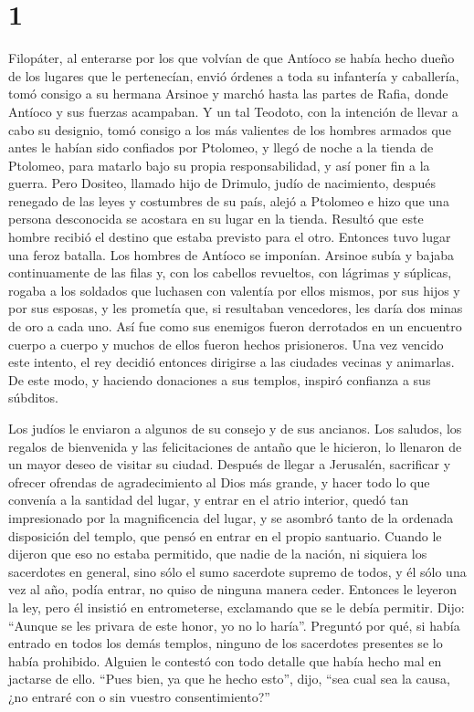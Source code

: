 \hypertarget{section}{%
\section{1}\label{section}}

 Filopáter, al enterarse por los que volvían de que
Antíoco se había hecho dueño de los lugares que le pertenecían, envió
órdenes a toda su infantería y caballería, tomó consigo a su hermana
Arsinoe y marchó hasta las partes de Rafia, donde Antíoco y sus fuerzas
acampaban.  Y un tal Teodoto, con la intención de llevar a
cabo su designio, tomó consigo a los más valientes de los hombres
armados que antes le habían sido confiados por Ptolomeo, y llegó de
noche a la tienda de Ptolomeo, para matarlo bajo su propia
responsabilidad, y así poner fin a la guerra.  Pero
Dositeo, llamado hijo de Drimulo, judío de nacimiento, después renegado
de las leyes y costumbres de su país, alejó a Ptolomeo e hizo que una
persona desconocida se acostara en su lugar en la tienda. Resultó que
este hombre recibió el destino que estaba previsto para el otro.
 Entonces tuvo lugar una feroz batalla. Los hombres de
Antíoco se imponían. Arsinoe subía y bajaba continuamente de las filas
y, con los cabellos revueltos, con lágrimas y súplicas, rogaba a los
soldados que luchasen con valentía por ellos mismos, por sus hijos y por
sus esposas, y les prometía que, si resultaban vencedores, les daría dos
minas de oro a cada uno.  Así fue como sus enemigos fueron
derrotados en un encuentro cuerpo a cuerpo y muchos de ellos fueron
hechos prisioneros.  Una vez vencido este intento, el rey
decidió entonces dirigirse a las ciudades vecinas y animarlas.
 De este modo, y haciendo donaciones a sus templos,
inspiró confianza a sus súbditos.

 Los judíos le enviaron a algunos de su consejo y de sus
ancianos. Los saludos, los regalos de bienvenida y las felicitaciones de
antaño que le hicieron, lo llenaron de un mayor deseo de visitar su
ciudad.  Después de llegar a Jerusalén, sacrificar y
ofrecer ofrendas de agradecimiento al Dios más grande, y hacer todo lo
que convenía a la santidad del lugar, y entrar en el atrio interior,
 quedó tan impresionado por la magnificencia del lugar, y
se asombró tanto de la ordenada disposición del templo, que pensó en
entrar en el propio santuario.  Cuando le dijeron que eso
no estaba permitido, que nadie de la nación, ni siquiera los sacerdotes
en general, sino sólo el sumo sacerdote supremo de todos, y él sólo una
vez al año, podía entrar, no quiso de ninguna manera ceder.
 Entonces le leyeron la ley, pero él insistió en
entrometerse, exclamando que se le debía permitir. Dijo: ``Aunque se les
privara de este honor, yo no lo haría''.  Preguntó por
qué, si había entrado en todos los demás templos, ninguno de los
sacerdotes presentes se lo había prohibido.  Alguien le
contestó con todo detalle que había hecho mal en jactarse de ello.
 ``Pues bien, ya que he hecho esto'', dijo, ``sea cual
sea la causa, ¿no entraré con o sin vuestro consentimiento?''

